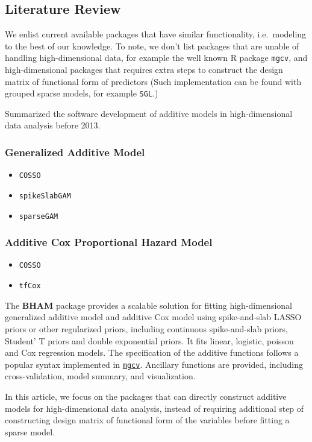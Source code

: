 \documentclass[
]{jss}
\begin{document}
\subsection{Literature Review}

We enlist current available packages that have similar functionality,
i.e.~modeling to the best of our knowledge. To note, we don't list
packages that are unable of handling high-dimensional data, for example
the well known R package \texttt{mgcv}, and high-dimensional packages
that requires extra steps to construct the design matrix of functional
form of predictors (Such implementation can be found with grouped sparse
models, for example \texttt{SGL}.)

\cite{Scheipl2013} Summarized the software development of additive
models in high-dimensional data analysis before 2013.

\subsubsection{Generalized Additive Model}
\begin{itemize}
\item \texttt{COSSO}
\item \texttt{spikeSlabGAM}
\item \texttt{sparseGAM}
\end{itemize}

\subsubsection{Additive Cox Proportional Hazard Model}
\begin{itemize}
\item \texttt{COSSO}
\item \texttt{tfCox}
\end{itemize}

The \textbf{BHAM} package provides a scalable solution for fitting
high-dimensional generalized additive model and additive Cox model using
spike-and-slab LASSO priors or other regularized priors, including
continuous spike-and-slab priors, Student' T priors and double
exponential priors. It fits linear, logistic, poisson and Cox regression
models. The specification of the additive functions follows a popular
syntax implemented in
\href{https://cran.r-project.org/web/packages/mgcv/index.html}{\texttt{mgcv}}.
Ancillary functions are provided, including cross-validation, model
summary, and visualization.

In this article, we focus on the packages that can directly construct
additive models for high-dimensional data analysis, instead of requiring
additional step of constructing design matrix of functional form of the
variables before fitting a sparse model.
\end{document}
